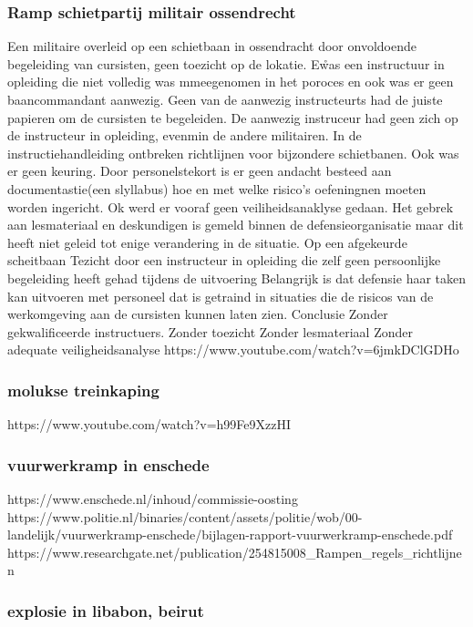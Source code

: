 \subsubsection{Ramp schietpartij militair ossendrecht }
Een militaire overleid op een schietbaan in ossendracht door onvoldoende begeleiding van cursisten, geen toezicht op de lokatie. E\r was een instructuur in opleiding die niet volledig was mmeegenomen in het poroces en ook was er geen baancommandant aanwezig. Geen van de aanwezig instructeurts had de juiste papieren om de cursisten te begeleiden. De aanwezig instruceur had geen zich op de instructeur in opleiding, evenmin de andere militairen. In de instructiehandleiding ontbreken richtlijnen voor bijzondere schietbanen. Ook was er geen keuring. Door personelstekort is er geen andacht besteed aan documentastie(een slyllabus) hoe en met welke risico’s oefeningnen moeten worden ingericht. Ok werd er vooraf geen veiliheidsanaklyse gedaan. Het gebrek aan lesmateriaal en deskundigen is gemeld binnen de defensieorganisatie maar dit heeft niet geleid tot enige verandering in de situatie.
Op een afgekeurde scheitbaan
Tezicht door een instructeur in opleiding die zelf geen persoonlijke begeleiding heeft gehad tijdens de uitvoering
Belangrijk is dat defensie haar taken kan uitvoeren met personeel dat is getraind in situaties die de risicos van de werkomgeving aan de cursisten kunnen laten zien.
Conclusie
Zonder gekwalificeerde instructuers.
Zonder toezicht
Zonder lesmateriaal
Zonder adequate veiligheidsanalyse
https://www.youtube.com/watch?v=6jmkDClGDHo 


\subsubsection{molukse treinkaping }
https://www.youtube.com/watch?v=h99Fe9XzzHI 

\subsubsection{vuurwerkramp in enschede }
https://www.enschede.nl/inhoud/commissie-oosting 
https://www.politie.nl/binaries/content/assets/politie/wob/00-landelijk/vuurwerkramp-enschede/bijlagen-rapport-vuurwerkramp-enschede.pdf 
https://www.researchgate.net/publication/254815008_Rampen_regels_richtlijnen 

 





\subsubsection{explosie in libabon, beirut 
}

